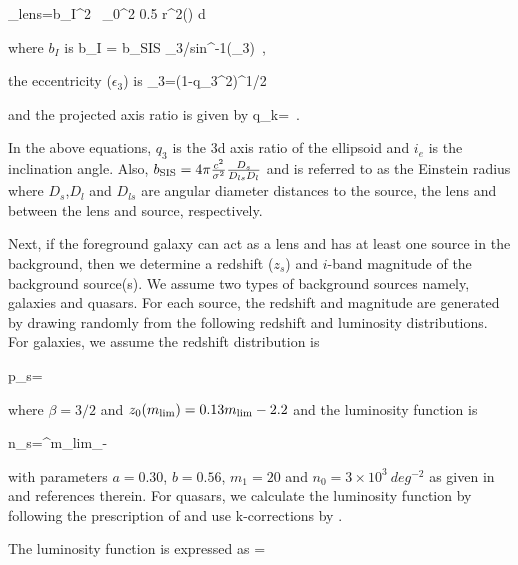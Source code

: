 \documentclass[useAMS,usenatbib,a4paper]{mn2e}
\begin{document}
\be
\sigma_{\rm lens}=b_I^2 \, \int_0^{2\pi} 0.5 r^2(\theta) d\theta
\ee

where $b_I$ is 
\be
b_I = b_{\rm SIS} \epsilon_3/sin^{-1}(\epsilon_3) \,,
\ee

the eccentricity ($\epsilon_3$) is 
\be
\epsilon_3=(1-q_3^2)^{1/2}
\ee

and the projected axis ratio is given by
\be
q_k= \,.
\ee

In the above equations, $q_3$ is the 3d axis ratio of the ellipsoid and $i_e$ is
the inclination angle. Also, $b_{\rm SIS}= 4\pi
\frac{c^2}{\sigma^2}\frac{D_{s}}{D_{ls}D_l}$ and is referred to as the
Einstein radius where $D_s$,$D_l$ and $D_{ls}$ are angular diameter distances to
the source, the lens and between the lens and source, respectively.


Next, if the foreground galaxy can act as a lens and has at least one source in the
background, then we determine a redshift ($z_s$) and $i$-band magnitude of the
background source(s). We assume two types of background sources namely, galaxies
and quasars. For each source, the redshift and magnitude are generated by drawing randomly from
the following redshift and luminosity distributions. For
galaxies, we assume the redshift distribution is 

\be
\label{eqn:ps}
p_s=
\ee

where $\beta=3/2$ and $z_0(m_{\rm lim})=0.13m_{\rm lim} - 2.2$ and the
luminosity function is

\be
\label{eqn:ns}
n_s=\int^{m_{\rm lim}}_{-\infty} 
\ee

with parameters $a=0.30$, $b=0.56$, $m_1=20$ and $n_0=3\times10^3~deg^{-2}$ as
given in \citep{Faure2009} and references therein. For quasars, we calculate
the luminosity function by following the prescription of \citep{Ogur2010} and
use k-corrections by \citep{Richards2006}. 

The luminosity function is expressed as
\be
{}=
\ee
\end{document}
